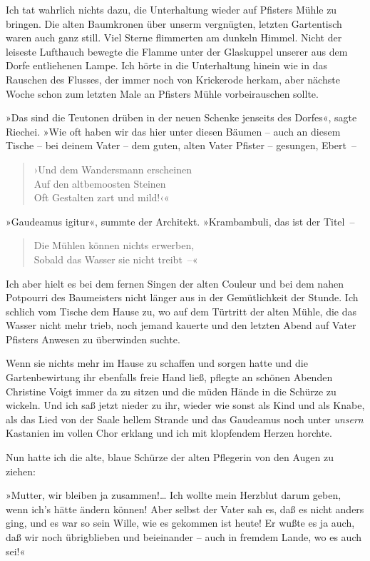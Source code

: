 Ich tat wahrlich nichts dazu, die Unterhaltung wieder auf Pfisters
Mühle zu bringen. Die alten Baumkronen über unserm vergnügten,
letzten Gartentisch waren auch ganz still. Viel Sterne flimmerten
am dunkeln Himmel. Nicht der leiseste Lufthauch bewegte die Flamme
unter der Glaskuppel unserer aus dem Dorfe entliehenen Lampe. Ich
hörte in die Unterhaltung hinein wie in das Rauschen des Flusses,
der immer noch von Krickerode herkam, aber nächste Woche schon zum
letzten Male an Pfisters Mühle vorbeirauschen sollte.

»Das sind die Teutonen drüben in der neuen Schenke jenseits des
Dorfes«, sagte Riechei. »Wie oft haben wir das hier unter diesen
Bäumen – auch an diesem Tische – bei deinem Vater – dem guten,
alten Vater Pfister – gesungen, Ebert~–

\begin{verse}
›Und dem Wandersmann erscheinen\\
Auf den altbemoosten Steinen\\
Oft Gestalten zart und mild!‹«
\end{verse}

»Gaudeamus igitur«, summte der Architekt. »Krambambuli, das ist der
Titel~–

\begin{verse}
Die Mühlen können nichts erwerben,\\
Sobald das Wasser sie nicht treibt~–«
\end{verse}

Ich aber hielt es bei dem fernen Singen der alten Couleur und bei
dem nahen Potpourri des Baumeisters nicht länger aus in der
Gemütlichkeit der Stunde. Ich schlich vom Tische dem Hause zu, wo
auf dem Türtritt der alten Mühle, die das Wasser nicht mehr trieb,
noch jemand kauerte und den letzten Abend auf Vater Pfisters
Anwesen zu überwinden suchte.

Wenn sie nichts mehr im Hause zu schaffen und sorgen hatte und die
Gartenbewirtung ihr ebenfalls freie Hand ließ, pflegte an schönen
Abenden Christine Voigt immer da zu sitzen und die müden Hände in
die Schürze zu wickeln. Und ich saß jetzt nieder zu ihr, wieder wie
sonst als Kind und als Knabe, als das Lied von der Saale hellem
Strande und das Gaudeamus noch unter \emph{unsern} Kastanien im
vollen Chor erklang und ich mit klopfendem Herzen horchte.

Nun hatte ich die alte, blaue Schürze der alten Pflegerin von den
Augen zu ziehen:

»Mutter, wir bleiben ja zusammen!\ldots{} Ich wollte mein Herzblut darum
geben, wenn ich's hätte ändern können! Aber selbst der Vater sah
es, daß es nicht anders ging, und es war so sein Wille, wie es
gekommen ist heute! Er wußte es ja auch, daß wir noch übrigblieben
und beieinander – auch in fremdem Lande, wo es auch sei!«

